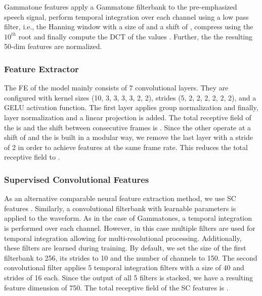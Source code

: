 \documentclass{INTERSPEECH2023}
\begin{document}
Gammatone features apply a Gammatone filterbank to the pre-emphasized speech signal, perform temporal integration over each channel using a low pass filter, i.e., the Hanning window with a size of  and a shift of , compress using the $10^{th}$ root and finally compute the \gls{DCT} of the values \cite{schlueter:icassp07}.
Further, the the resulting 50-dim features are normalized.

\subsubsection{\wvtwo Feature Extractor}
The \gls{FE} of the \wvtwo model \cite{facebook2020wav2vec2} mainly consists of 7 convolutional layers.
They are configured with kernel sizes (10, 3, 3, 3, 3, 2, 2), strides (5, 2, 2, 2, 2, 2, 2), and a GELU activation function.
The first layer applies group normalization and finally, layer normalization and a linear projection is added.
The total receptive field of the \wvtwo \fe is  and the shift between consecutive frames is .
Since the other \fes operate at a shift of  and the \wvtwo \fe is built in a modular way, we remove the last layer with a stride of 2 in order to achieve features at the same frame rate.
This reduces the total receptive field to .

\subsubsection{Supervised Convolutional Features}
As an alternative comparable neural feature extraction method, we use \gls{SC} features \cite{tuske2018:waveform, vieting2021waveform}.
Similarly, a convolutional filterbank with learnable parameters is applied to the waveform.
As in the case of Gammatones, a temporal integration is performed over each channel.
However, in this case multiple filters are used for temporal integration allowing for multi-resolutional processing.
Additionally, these filters are learned during training.
By default, we set the size of the first filterbank to 256, its strides to 10 and the number of channels to 150.
The second convolutional filter applies 5 temporal integration filters with a size of 40 and strides of 16 each.
Since the output of all 5 filters is stacked, we have a resulting feature dimension of 750.
The total receptive field of the \gls{SC} features is .
\end{document}
